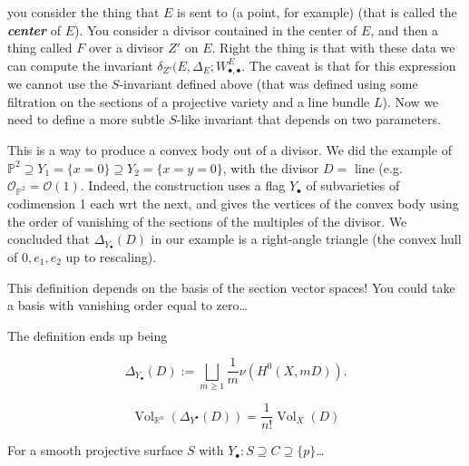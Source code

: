 you consider the thing that $E$ is sent to (a
point, for example) (that is called the
\textit{\textbf{center}} of $E$). You
consider a divisor contained in the center of
$E$, and then a thing called $F$ over a
divisor $Z'$ on $E$. Right the thing is that
with these data we can compute the invariant
$\delta_{Z'}(E,\Delta_E;W^E_{\bullet,
\bullet}$.
The caveat is that for this expression we
cannot use the $S$-invariant defined above
(that was defined using some filtration on
the sections of a projective variety and a
line bundle $L$). Now we need to define a
more subtle $S$-like invariant that depends
on two parameters.

\medskip{}

This is a way to produce a convex body out of
a divisor. We did the example of
$\mathbb{P}^2 \supseteq Y_1=\{x=0\}\supseteq
Y_2=\{x=y=0\}$, with the divisor $D=$ line
(e.g.
$\mathcal{O}_{\mathbb{P}^2}=\mathcal{O}(1)$.
Indeed, the construction uses a flag
$Y_\bullet$ of subvarieties of codimension 1
each wrt the next, and gives the vertices of
the convex body using the order of vanishing
of the sections of the multiples of the
divisor. We concluded that
$\Delta_{Y_\bullet}(D)$ in our example is a
right-angle triangle (the convex hull of
$0,e_1,e_2$ up to rescaling).

\begin{remark}[Zikas]
\label{remark-montero-9}
This definition depends on the basis of the
section vector spaces! You could take a basis
with vanishing order equal to zero\ldots{}
\end{remark}

The definition ends up being

$$
\Delta_{Y_{\bullet}}(D):=\bigsqcup_{m \geq
1}\frac{1}{m}\nu(H^{0}(X,mD)).
$$

\begin{theorem}
\label{theorem-montero-6}

$$
\operatorname{Vol}_{\mathbb{R}^n}(\Delta_{Y^
\bullet}(D))=\frac{1}{n!}
\operatorname{Vol}_X(D)
$$

\end{theorem}

\begin{example}
\label{example-montero-4}
For a smooth projective surface $S$ with
$Y_\bullet:S \supseteq C \supseteq \{
p\}$\ldots{}
\end{example}

\medskip{}

